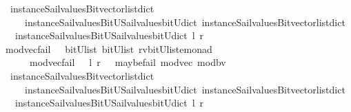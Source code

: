 \begin{isabellebody}
\ \ {\isacharparenleft}instance{\isacharunderscore}Sail{}{\isacharunderscore}values{\isacharunderscore}Bitvector{\isacharunderscore}list{\isacharunderscore}dict\isanewline
\ \ \ \ \ instance{\isacharunderscore}Sail{}{\isacharunderscore}values{\isacharunderscore}BitU{\isacharunderscore}Sail{}{\isacharunderscore}values{\isacharunderscore}bitU{\isacharunderscore}dict{\isacharparenright}\ {\isacharparenleft}instance{\isacharunderscore}Sail{}{\isacharunderscore}values{\isacharunderscore}Bitvector{\isacharunderscore}list{\isacharunderscore}dict\isanewline
\ \ \ instance{\isacharunderscore}Sail{}{\isacharunderscore}values{\isacharunderscore}BitU{\isacharunderscore}Sail{}{\isacharunderscore}values{\isacharunderscore}bitU{\isacharunderscore}dict{\isacharparenright}\ l\ r\ {\isacharparenright}{\isachardoublequoteclose}\isanewline
\isanewline
{}\isamarkupfalse%
\ mod{\isacharunderscore}vec{\isacharunderscore}fail\ \ {\isacharcolon}{\isacharcolon}\ {\isachardoublequoteopen}{\isacharparenleft}bitU{\isacharparenright}list\ {\isasymRightarrow}{\isacharparenleft}bitU{\isacharparenright}list\ {\isasymRightarrow}{\isacharparenleft}{\isacharprime}rv{\isacharcomma}{\isacharparenleft}{\isacharparenleft}bitU{\isacharparenright}list{\isacharparenright}{\isacharcomma}{\isacharprime}e{\isacharparenright}monad\ {\isachardoublequoteclose}\ \ \ \isanewline
\ \ \ \ \ {\isachardoublequoteopen}\ mod{\isacharunderscore}vec{\isacharunderscore}fail\ \ \ l\ r\ {\isacharequal}\ {\isacharparenleft}\ maybe{\isacharunderscore}fail\ {\isacharparenleft}{\isacharprime}{\isacharprime}mod{\isacharunderscore}vec{\isacharprime}{\isacharprime}{\isacharparenright}\ {\isacharparenleft}mod{\isacharunderscore}bv\ \isanewline
\ \ {\isacharparenleft}instance{\isacharunderscore}Sail{}{\isacharunderscore}values{\isacharunderscore}Bitvector{\isacharunderscore}list{\isacharunderscore}dict\isanewline
\ \ \ \ \ instance{\isacharunderscore}Sail{}{\isacharunderscore}values{\isacharunderscore}BitU{\isacharunderscore}Sail{}{\isacharunderscore}values{\isacharunderscore}bitU{\isacharunderscore}dict{\isacharparenright}\ {\isacharparenleft}instance{\isacharunderscore}Sail{}{\isacharunderscore}values{\isacharunderscore}Bitvector{\isacharunderscore}list{\isacharunderscore}dict\isanewline
\ \ \ instance{\isacharunderscore}Sail{}{\isacharunderscore}values{\isacharunderscore}BitU{\isacharunderscore}Sail{}{\isacharunderscore}values{\isacharunderscore}bitU{\isacharunderscore}dict{\isacharparenright}\ l\ r{\isacharparenright}{\isacharparenright}{\isachardoublequoteclose}\isanewline

\end{isabellebody}
